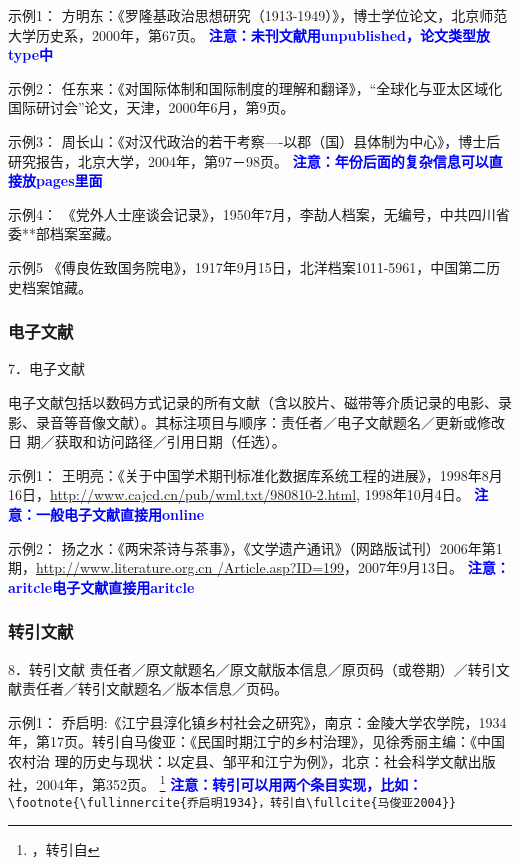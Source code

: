 \documentclass{article}
\newcommand{\qd}[1]{\textbf{\textcolor{blue}{#1}}}
\begin{document}
示例1：
方明东：《罗隆基政治思想研究（1913-1949）》，博士学位论文，北京师范大学历史系，2000年，第67页。
\qd{注意：未刊文献用unpublished，论文类型放type中}

示例2：
任东来：《对国际体制和国际制度的理解和翻译》，“全球化与亚太区域化国际研讨会”论文，天津，2000年6月，第9页。

示例3：
周长山：《对汉代政治的若干考察----以郡（国）县体制为中心》，博士后研究报告，北京大学，2004年，第97－98页。
\qd{注意：年份后面的复杂信息可以直接放pages里面}

示例4：
《党外人士座谈会记录》，1950年7月，李劼人档案，无编号，中共四川省委**部档案室藏。

示例5
《傅良佐致国务院电》，1917年9月15日，北洋档案1011-5961，中国第二历史档案馆藏。


\subsubsection{电子文献}

7．电子文献

电子文献包括以数码方式记录的所有文献（含以胶片、磁带等介质记录的电影、录影、录音等音像文献）。其标注项目与顺序：责任者／电子文献题名／更新或修改日
期／获取和访问路径／引用日期（任选）。

示例1：
王明亮：《关于中国学术期刊标准化数据库系统工程的进展》，1998年8月16日，\url{http://www.cajcd.cn/pub/wml.txt/980810-2.html}, 1998年10月4日。
\qd{注意：一般电子文献直接用online}

示例2：
扬之水：《两宋茶诗与茶事》，《文学遗产通讯》（网路版试刊）2006年第1期，\url{http://www.literature.org.cn /Article.asp?ID=199}，2007年9月13日。
\qd{注意：aritcle电子文献直接用aritcle}



\subsubsection{转引文献}
8．转引文献
责任者／原文献题名／原文献版本信息／原页码（或卷期）／转引文献责任者／转引文献题名／版本信息／页码。

示例1：
乔启明:《江宁县淳化镇乡村社会之研究》，南京：金陵大学农学院，1934年，第17页。转引自马俊亚：《民国时期江宁的乡村治理》，见徐秀丽主编：《中国农村治
理的历史与现状：以定县、邹平和江宁为例》，北京：社会科学文献出版社，2004年，第352页。
\footnote{，转引自}
\qd{注意：转引可以用两个条目实现，比如：}
\verb|\footnote{\fullinnercite{乔启明1934}，转引自\fullcite{马俊亚2004}}|
\end{document}
